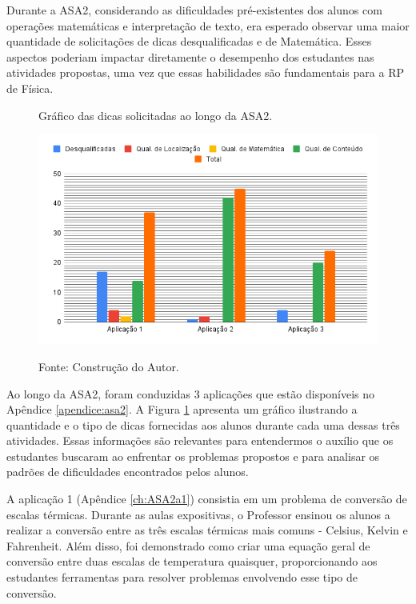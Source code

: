 Durante a ASA2, considerando as dificuldades pré-existentes dos alunos com operações matemáticas e interpretação de texto, era esperado observar uma maior quantidade de solicitações de dicas desqualificadas e de Matemática. Esses aspectos poderiam impactar diretamente o desempenho dos estudantes nas atividades propostas, uma vez que essas habilidades são fundamentais para a RP de Física. 

\begin{figure}[ht]
\begin{center}
\caption{Gráfico das dicas solicitadas ao longo da ASA2.}
\includegraphics[width=1\textwidth]{fig/graficoDicasASA2.png}
\label{fig:dicasASA2}
\caption*{Fonte: Construção do Autor.}
\end{center}
\end{figure}

Ao longo da ASA2, foram conduzidas 3 aplicações que estão disponíveis no Apêndice \ref{apendice:asa2}. A Figura \ref{fig:dicasASA2} apresenta um gráfico ilustrando a quantidade e o tipo de dicas fornecidas aos alunos durante cada uma dessas três atividades. Essas informações são relevantes para entendermos o auxílio que os estudantes buscaram ao enfrentar os problemas propostos e para analisar os padrões de dificuldades encontrados pelos alunos.

A aplicação 1 (Apêndice \ref{ch:ASA2a1}) consistia em um problema de conversão de escalas térmicas. Durante as aulas expositivas, o Professor ensinou os alunos a realizar a conversão entre as três escalas térmicas mais comuns - Celsius, Kelvin e Fahrenheit. Além disso, foi demonstrado como criar uma equação geral de conversão entre duas escalas de temperatura quaisquer, proporcionando aos estudantes ferramentas para resolver problemas envolvendo esse tipo de conversão.

